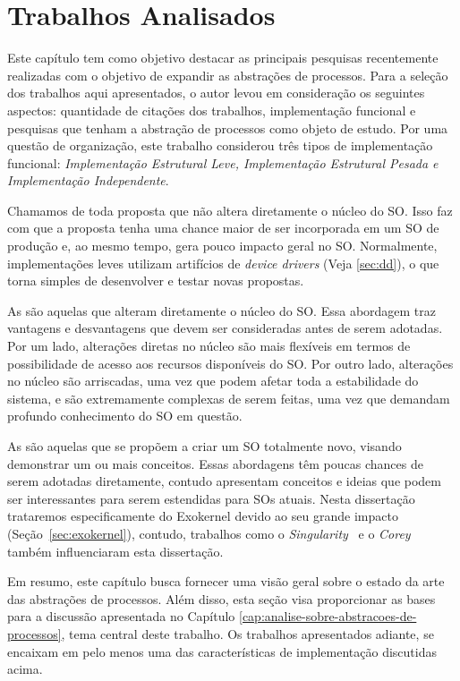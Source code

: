 \chapter{Trabalhos Analisados}
\label{cap:trabalhos-analisados}

Este capítulo tem como objetivo destacar as principais pesquisas recentemente
realizadas com o objetivo de expandir as abstrações de processos. Para a
seleção dos trabalhos aqui apresentados, o autor levou em consideração os
seguintes aspectos: quantidade de citações dos trabalhos, implementação
funcional e pesquisas que tenham a abstração de processos como objeto de
estudo. Por uma questão de organização, este trabalho considerou três tipos de
implementação funcional: \textit{Implementação Estrutural Leve, Implementação
Estrutural Pesada e Implementação Independente}.

Chamamos de  toda proposta que não
altera diretamente o núcleo do SO. Isso faz com que a proposta tenha uma chance
maior de ser incorporada em um SO de produção e, ao mesmo tempo, gera pouco
impacto geral no SO. Normalmente, implementações leves utilizam artifícios de
\emph{device drivers} (Veja \ref{sec:dd}), o que torna simples de desenvolver e
testar novas propostas.

As  são aquelas que alteram
diretamente o núcleo do SO. Essa abordagem traz vantagens e desvantagens que
devem ser consideradas antes de serem adotadas. Por um lado, alterações diretas
no núcleo são mais flexíveis em termos de possibilidade de acesso aos recursos
disponíveis do SO. Por outro lado, alterações no núcleo são arriscadas, uma vez
que podem afetar toda a estabilidade do sistema, e são extremamente complexas
de serem feitas, uma vez que demandam profundo conhecimento do SO em questão.

As  são aquelas que se propõem a
criar um SO totalmente novo, visando demonstrar um ou mais conceitos. Essas
abordagens têm poucas chances de serem adotadas diretamente, contudo apresentam
conceitos e ideias que podem ser interessantes para serem estendidas para SOs
atuais. Nesta dissertação trataremos especificamente do Exokernel devido ao seu
grande impacto (Seção~\ref{sec:exokernel}), contudo, trabalhos como o
\emph{Singularity}~\citep{aiken} e o \emph{Corey}~\citep{corey} também
influenciaram esta dissertação.

Em resumo, este capítulo busca fornecer uma visão geral sobre o estado da arte
das abstrações de processos. Além disso, esta seção visa proporcionar as bases
para a discussão apresentada no Capítulo
\ref{cap:analise-sobre-abstracoes-de-processos}, tema central deste trabalho.
Os trabalhos apresentados adiante, se encaixam em pelo menos uma das
características de implementação discutidas acima.

